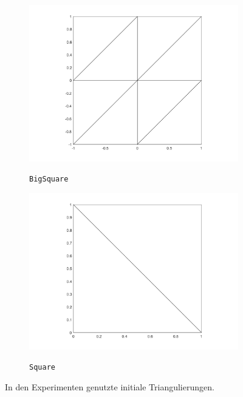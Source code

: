 \begin{figure}[p]
  \centering
  \begin{subfigure}[b]{.48\linewidth}
    \centering
    \caption{\texttt{BigSquare}}
    \includegraphics[trim = 90 30 90 20, clip, width=\linewidth]
      {pictures/chapExperiments/secGeneralInfo/bigSquareTriang.png}
    \label{fig:triangBigSquare}
  \end{subfigure}
  \quad
  \begin{subfigure}[b]{.48\linewidth}
    \centering
    \caption{\texttt{Square}}
    \includegraphics[trim = 90 30 90 20, clip, width=\linewidth]
      {pictures/chapExperiments/secGeneralInfo/squareTriang.png}
    \label{fig:triangSquare}
  \end{subfigure}
  \caption{In den Experimenten genutzte initiale Triangulierungen.}
  \label{fig:initialTriangulations}
\end{figure}
